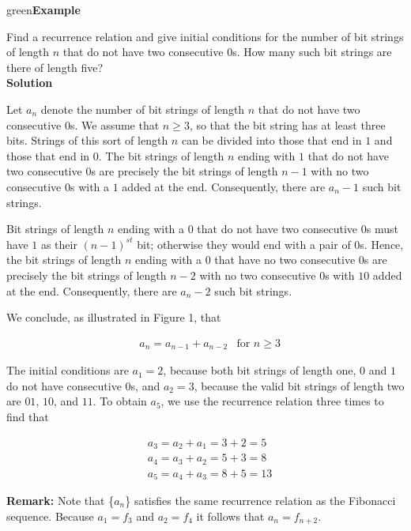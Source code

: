 \documentclass[11pt]{article}
\newenvironment{example}[1][\unskip]{\begin{mybox}{green}{\textbf{Example} {#1}}}{\end{mybox}}
\begin{document}
\begin{example}

Find a recurrence relation and give initial conditions for the number of bit strings of length $n$ that do not have two consecutive $0$s. How many such bit strings are there of length five?\\

\textbf{Solution}

Let $a_n$ denote the number of bit strings of length $n$ that do not have two consecutive $0$s. We assume that $n \geq 3$, so that the bit string has at least three bits. Strings of this sort of length $n$ can be divided into those that end in $1$ and those that end in $0$. The bit strings of length $n$ ending with $1$ that do not have two consecutive $0$s are precisely the bit strings of length $n - 1$ with no two consecutive $0$s with a $1$ added at the end. Consequently, there are $a_n - 1$ such bit strings.

Bit strings of length $n$ ending with a $0$ that do not have two consecutive $0$s must have
$1$ as their $(n - 1)^{st}$ bit; otherwise they would end with a pair of $0$s. Hence, the bit strings of length $n$ ending with a $0$ that have no two consecutive $0$s are precisely the bit strings of length $n - 2$ with no two consecutive $0$s with $10$ added at the end. Consequently, there are $a_n - 2$ such bit strings.


We conclude, as illustrated in Figure 1, that

\begin{align*}
    &a_n = a_{n - 1} + a_{n - 2} &\text{for } n \geq 3    
\end{align*}

The initial conditions are $a_1 = 2$, because both bit strings of length one, $0$ and $1$ do not have consecutive $0$s, and $a_2 = 3$, because the valid bit strings of length two are $01$, $10$, and $11$. To obtain $a_5$, we use the recurrence relation three times to find that

\begin{align*}
    &a_3 = a_2 + a_1 = 3 + 2 = 5\\
    &a_4 = a_3 + a_2 = 5 + 3 = 8\\
    &a_5 = a_4 + a_3 = 8 + 5 = 13
\end{align*}

\textbf{Remark:} Note that \{$a_n$\} satisfies the same recurrence relation as the Fibonacci sequence. Because $a_1 = f_3$ and $a_2 = f_4$ it follows that $a_n = f_{n+2}$.
\end{example}
\end{document}
